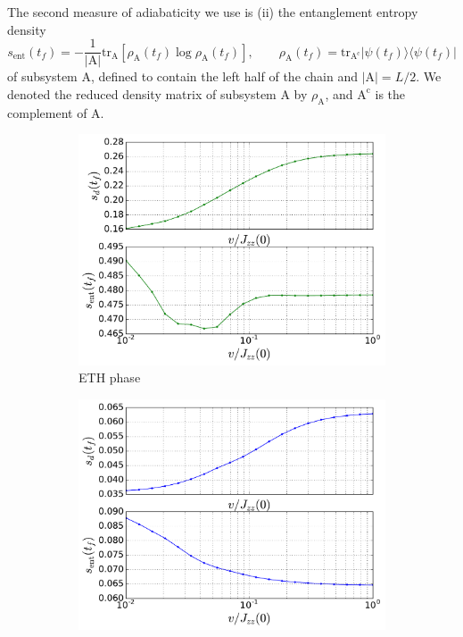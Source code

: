 \documentclass{SciPost}
\newcommand\0{\scalebox{-1}[1]{0}}
\begin{document}
The second measure of adiabaticity we use is (ii) the entanglement entropy density
\begin{equation}
s_\mathrm{ent}(t_f) = -\frac{1}{|\mathrm{A}|}\mathrm{tr}_{\mathrm{A}}\left[\rho_\mathrm{A}(t_f)\log\rho_\mathrm{A}(t_f)\right], \qquad \rho_\mathrm{A}(t_f) = \mathrm{tr}_{\mathrm{A^c}} |\psi(t_f)\rangle\langle\psi(t_f)|
\end{equation}
of subsystem A, defined to contain the left half of the chain and $|\mathrm{A}|=L/2$. We denoted the reduced density matrix of subsystem A by $\rho_\mathrm{A}$, and $\mathrm{A^c}$ is the complement of A.

\begin{figure}[t!]
	\centering
	\begin{subfigure}[b]{0.496\textwidth}
		\includegraphics[width=\textwidth]{example1_ETH.pdf}
		\caption{ETH phase}
		\label{fig:gull}
	\end{subfigure}
	\begin{subfigure}[b]{0.496\textwidth}
		\includegraphics[width=\textwidth]{example1_MBL.pdf}

\end{subfigure}
\end{figure}
\end{document}
